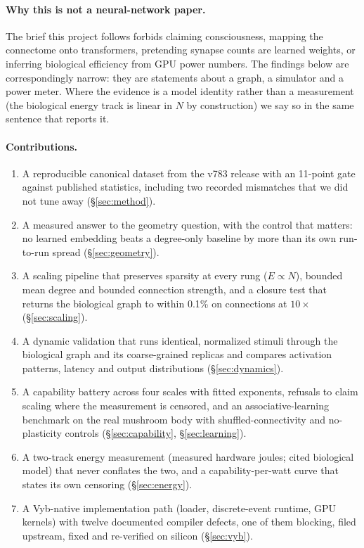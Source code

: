 \documentclass[11pt,a4paper]{article}
\begin{document}
\paragraph{Why this is not a neural-network paper.} The brief this project follows forbids
claiming consciousness, mapping the connectome onto transformers, pretending synapse counts are
learned weights, or inferring biological efficiency from GPU power numbers. The findings below
are correspondingly narrow: they are statements about a graph, a simulator and a
power meter. Where the evidence is a model identity rather than a measurement (the biological
energy track is linear in $N$ by construction) we say so in the same sentence that reports it.

\paragraph{Contributions.}
\begin{enumerate}[label=\textbf{C\arabic*.}]
\item A reproducible canonical dataset from the v783 release with an 11-point gate against
published statistics, including two recorded mismatches that we did not tune away
(\S\ref{sec:method}).
\item A measured answer to the geometry question, with the control that matters: no learned
embedding beats a degree-only baseline by more than its own run-to-run spread
(\S\ref{sec:geometry}).
\item A scaling pipeline that preserves sparsity at every rung ($E\propto N$), bounded mean
degree and bounded connection strength, and a closure test that returns the biological graph to
within 0.1\% on connections at $10\times$ (\S\ref{sec:scaling}).
\item A dynamic validation that runs identical, normalized stimuli through the biological graph
and its coarse-grained replicas and compares activation patterns, latency and output
distributions (\S\ref{sec:dynamics}).
\item A capability battery across four scales with fitted exponents, refusals to claim scaling
where the measurement is censored, and an associative-learning benchmark on the real mushroom
body with shuffled-connectivity and no-plasticity controls (\S\ref{sec:capability},
\S\ref{sec:learning}).
\item A two-track energy measurement (measured hardware joules; cited biological model) that
never conflates the two, and a capability-per-watt curve that states its own censoring
(\S\ref{sec:energy}).
\item A Vyb-native implementation path (loader, discrete-event runtime, GPU kernels) with twelve
documented compiler defects, one of them blocking, filed upstream, fixed and re-verified on
silicon (\S\ref{sec:vyb}).
\end{enumerate}
\end{document}

